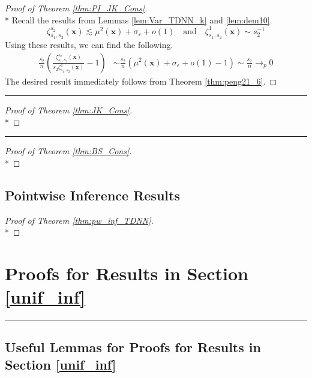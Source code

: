 \documentclass[letterpaper,10pt]{article}
\numberwithin{equation}{section}
\numberwithin{thm}{section}
\numberwithin{lem}{section}
\numberwithin{cor}{section}
\newcommand{\1}{\mathbbm{1}}
\begin{document}
\begin{proof}[Proof of Theorem \ref{thm:PI_JK_Cons}]\mbox{}\\*
	Recall the results from Lemmas \ref{lem:Var_TDNN_k} and \ref{lem:dem10}.
	\begin{equation*}
		\zeta_{s_1, s_2}^{s_2}\left(\mathbf{x}\right) \lesssim \mu^2(\mathbf{x}) + \sigma_{\varepsilon} + o(1)
		\quad \text{and} \quad
		\zeta_{s_1, s_2}^{1}\left(\mathbf{x}\right) \sim s_2^{-1}
	\end{equation*}
	Using these results, we can find the following.
	\begin{equation}
		\begin{aligned}
			\frac{s_2}{n}\left(\frac{
				\zeta_{s_1, s_2}^{s_2}\left(\mathbf{x}\right)}{s_2 \zeta_{s_1, s_2}^{1}\left(\mathbf{x}\right)} - 1\right)
			 & \sim \frac{s_2}{n}\left(\mu^2(\mathbf{x}) + \sigma_{\varepsilon} + o(1) - 1\right)
			\sim \frac{s_2}{n} \rightarrow_{p} 0
		\end{aligned}
	\end{equation}
	The desired result immediately follows from Theorem \ref{thm:peng21_6}.
\end{proof}

\hrule

\begin{proof}[Proof of Theorem \ref{thm:JK_Cons}]\mbox{}\\*

\end{proof}

\hrule

\begin{proof}[Proof of Theorem \ref{thm:BS_Cons}]\mbox{}\\*

\end{proof}

\newpage
\subsection{Pointwise Inference Results}

\begin{proof}[Proof of Theorem \ref{thm:pw_inf_TDNN}]\mbox{}\\*

\end{proof}

\newpage
\section{Proofs for Results in Section \ref{unif_inf}}
\hrule
\subsection{Useful Lemmas for Proofs for Results in Section \ref{unif_inf}}
\end{document}
